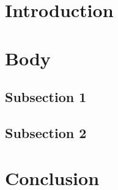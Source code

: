 \documentclass[a4paper, 11pt, titlepage]{article}
\begin{document}


\section{Introduction}

\section{Body}
\subsection{Subsection 1}
\subsection{Subsection 2}

\section{Conclusion}

\printbibliography


\end{document}
